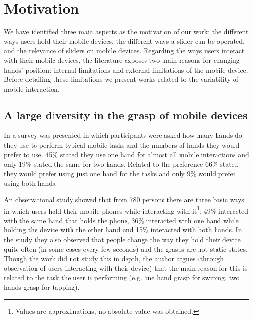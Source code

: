 \documentclass{sigchi}
\begin{document}
\section{Motivation}
We have identified three main aspects as the motivation of our work: the different ways users hold their mobile devices, the different ways a slider can be operated, and the relevance of sliders on mobile devices. Regarding the ways users interact with their mobile devices, the literature exposes two main reasons for changing hands’ position: internal limitations and external limitations of the mobile device. Before detailing these limitations we present works related to the variability of mobile interaction.

\subsection{A large diversity in the grasp of mobile devices}
In \cite{Karlson06} a survey was presented in which participants were asked how many hands do they use to perform typical mobile tasks and the numbers of hands they would prefer to use. 45\% stated they use one hand for almost all mobile interactions and only 19\% stated the same for two hands. Related to the preference 66\% stated they would prefer using just one hand for the tasks and only 9\% would prefer using both hands.

An observational study \cite{hoober13} showed that from 780 persons there are three basic ways in which users hold their mobile phones while interacting with it\footnote{Values are approximations, no absolute value was obtained.}: 49\% interacted with the same hand that holds the phone, 36\% interacted with one hand while holding the device with the other hand and 15\% interacted with both hands. In the study they also observed that people change the way they hold their device quite often (in some cases every few seconds) and the grasps are not static states. Though the work did not study this in depth, the author argues (through observation of users interacting with their device) that the main reason for this is related to the task the user is performing (e.g. one hand grasp for swiping, two hands grasp for tapping).
\end{document}
